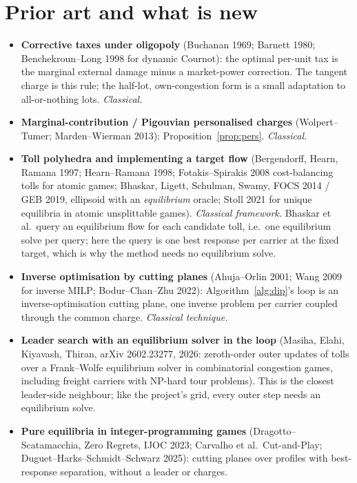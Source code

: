\documentclass[11pt]{article}
\theoremstyle{definition}
\theoremstyle{remark}
\begin{document}
\section{Prior art and what is new}\label{sec:prior}

\begin{itemize}[leftmargin=1.2em]
\item \textbf{Corrective taxes under oligopoly} (Buchanan 1969; Barnett 1980; Benchekroun--Long 1998 for dynamic Cournot): the optimal per-unit tax is the marginal external damage minus a market-power correction. The tangent charge is this rule; the half-lot, own-congestion form is a small adaptation to all-or-nothing lots. \emph{Classical.}
\item \textbf{Marginal-contribution / Pigouvian personalised charges} (Wolpert--Tumer; Marden--Wierman 2013): Proposition~\ref{prop:pers}. \emph{Classical.}
\item \textbf{Toll polyhedra and implementing a target flow} (Bergendorff, Hearn, Ramana 1997; Hearn--Ramana 1998; Fotakis--Spirakis 2008 cost-balancing tolls for atomic games; Bhaskar, Ligett, Schulman, Swamy, FOCS 2014 / GEB 2019, ellipsoid with an \emph{equilibrium} oracle; Stoll 2021 for unique equilibria in atomic unsplittable games). \emph{Classical framework.} Bhaskar et al.\ query an equilibrium flow for each candidate toll, i.e.\ one equilibrium solve per query; here the query is one best response per carrier at the fixed target, which is why the method needs no equilibrium solve.
\item \textbf{Inverse optimisation by cutting planes} (Ahuja--Orlin 2001; Wang 2009 for inverse MILP; Bodur--Chan--Zhu 2022): Algorithm~\ref{alg:dip}'s loop is an inverse-optimisation cutting plane, one inverse problem per carrier coupled through the common charge. \emph{Classical technique.}
\item \textbf{Leader search with an equilibrium solver in the loop} (Masiha, Elahi, Kiyavash, Thiran, arXiv 2602.23277, 2026: zeroth-order outer updates of tolls over a Frank--Wolfe equilibrium solver in combinatorial congestion games, including freight carriers with NP-hard tour problems). This is the closest leader-side neighbour; like the project's grid, every outer step needs an equilibrium solve.
\item \textbf{Pure equilibria in integer-programming games} (Dragotto--Scatamacchia, Zero Regrets, IJOC 2023; Carvalho et al.\ Cut-and-Play; Duguet--Harks--Schmidt--Schwarz 2025): cutting planes over profiles with best-response separation, without a leader or charges.
\end{itemize}
\end{document}
